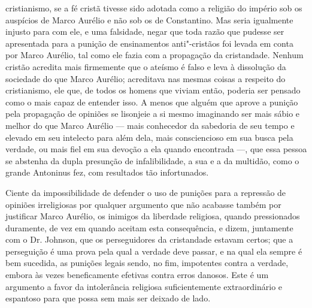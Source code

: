 cristianismo, se a fé cristã tivesse sido adotada como a
religião do império sob os auspícios de Marco Aurélio e não sob os de
Constantino. Mas seria igualmente injusto para com ele, e uma
falsidade, negar que toda razão que pudesse ser apresentada
para a punição de ensinamentos anti"-cristãos foi levada
em conta por Marco Aurélio, tal como ele fazia com a propagação da
cristandade. Nenhum cristão acredita mais firmemente que o ateísmo é
falso e leva à dissolução da sociedade do que Marco Aurélio;
acreditava nas mesmas coisas a respeito do cristianismo, ele que, de
todos os homens que viviam então, poderia ser pensado como o mais
capaz de entender isso. A menos que alguém que aprove a punição pela
propagação de opiniões se lisonjeie a si mesmo imaginando ser mais
sábio e melhor do que Marco Aurélio --- mais conhecedor da
sabedoria de seu tempo e elevado em seu intelecto para além dela,
mais consciencioso em sua busca pela verdade, ou mais fiel em sua
devoção a ela quando encontrada ---, que essa pessoa se abstenha da dupla
presunção de infalibilidade, a sua e a da multidão, como o grande
Antoninus fez, com resultados tão infortunados. 

Ciente da impossibilidade de defender o uso de punições para a repressão
de opiniões irreligiosas por qualquer argumento que não acabasse também
por justificar Marco Aurélio, os inimigos da liberdade religiosa,
quando pressionados duramente, de vez em quando aceitam esta
consequência, e dizem, juntamente com o Dr. Johnson, que os
perseguidores da cristandade estavam certos; que a perseguição é uma
prova pela qual a verdade deve passar, e na qual ela sempre é bem
sucedida, as punições legais sendo, no fim, impotentes contra
a verdade, embora às vezes beneficamente efetivas contra erros
danosos. Este é um argumento a favor da intolerância religiosa
suficientemente extraordinário e espantoso para que possa sem mais ser deixado de lado.

